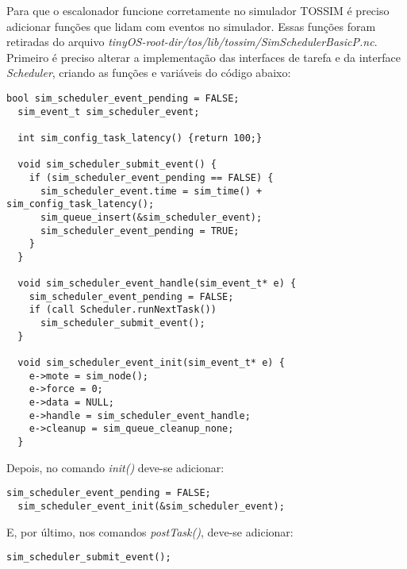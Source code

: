 Para que o escalonador funcione corretamente no simulador TOSSIM é preciso adicionar funções que lidam com eventos no
simulador. Essas funções foram retiradas do arquivo
\textit{tinyOS-root-dir/tos/lib/tossim/SimSchedulerBasicP.nc}.
Primeiro é preciso alterar a implementação das interfaces de tarefa e da interface \textit{Scheduler}, criando as
funções e variáveis do código abaixo:
\begin{lstlisting}[frame=single]
  bool sim_scheduler_event_pending = FALSE;
  sim_event_t sim_scheduler_event;

  int sim_config_task_latency() {return 100;}

  void sim_scheduler_submit_event() {
    if (sim_scheduler_event_pending == FALSE) {
      sim_scheduler_event.time = sim_time() + sim_config_task_latency();
      sim_queue_insert(&sim_scheduler_event);
      sim_scheduler_event_pending = TRUE;
    }
  }

  void sim_scheduler_event_handle(sim_event_t* e) {
    sim_scheduler_event_pending = FALSE;
    if (call Scheduler.runNextTask()) 
      sim_scheduler_submit_event();
  }

  void sim_scheduler_event_init(sim_event_t* e) {
    e->mote = sim_node();
    e->force = 0;
    e->data = NULL;
    e->handle = sim_scheduler_event_handle;
    e->cleanup = sim_queue_cleanup_none;
  }
\end{lstlisting}

Depois, no comando \textit{init()} deve-se adicionar:
\begin{lstlisting}[frame=single]
  sim_scheduler_event_pending = FALSE;
  sim_scheduler_event_init(&sim_scheduler_event);
\end{lstlisting}
E, por último, nos comandos \textit{postTask()}, deve-se adicionar:
\begin{lstlisting}[frame=single]
  sim_scheduler_submit_event();
\end{lstlisting}

